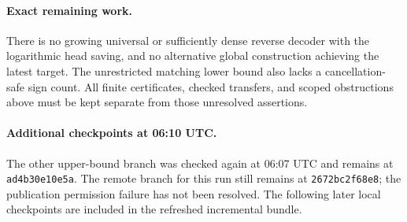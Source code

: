 \documentclass[11pt]{article}
\begin{document}
\paragraph{Exact remaining work.}
There is no growing universal or sufficiently dense reverse decoder
with the logarithmic head saving, and no alternative global
construction achieving the latest target. The unrestricted matching
lower bound also lacks a cancellation-safe sign count. All finite
certificates, checked transfers, and scoped obstructions above must
be kept separate from those unresolved assertions.

\paragraph{Additional checkpoints at 06:10 UTC.}
The other upper-bound branch was checked again at 06:07 UTC and remains
at \texttt{ad4b30e10e5a}. The remote branch for this run still remains at
\texttt{2672bc2f68e8}; the publication permission failure has not been
resolved. The following later local checkpoints are included in the
refreshed incremental bundle.
\end{document}
